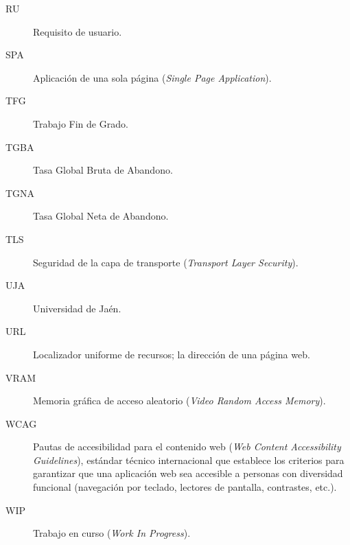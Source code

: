 \begin{description}
  \item[RU] Requisito de usuario.
  \item[SPA] Aplicación de una sola página (\textit{Single Page Application}).
  \item[TFG] Trabajo Fin de Grado.
  \item[TGBA] Tasa Global Bruta de Abandono.
  \item[TGNA] Tasa Global Neta de Abandono.
  \item[TLS] Seguridad de la capa de transporte (\textit{Transport Layer Security}).
  \item[UJA] Universidad de Jaén.
  \item[URL] Localizador uniforme de recursos; la dirección de una página web.
  \item[VRAM] Memoria gráfica de acceso aleatorio (\textit{Video Random Access Memory}).
    \item[WCAG] Pautas de accesibilidad para el contenido web (\textit{Web Content 
        Accessibility Guidelines}), estándar técnico internacional que establece los criterios 
        para garantizar que una aplicación web sea accesible a personas con diversidad funcional 
        (navegación por teclado, lectores de pantalla, contrastes, etc.).

  \item[WIP] Trabajo en curso (\textit{Work In Progress}).
\end{description}